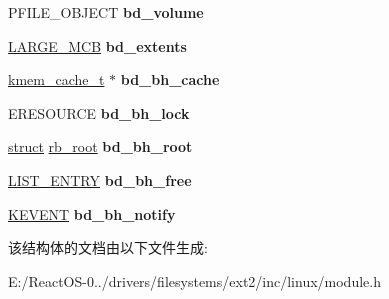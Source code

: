 \begin{DoxyCompactItemize}
P\+F\+I\+L\+E\+\_\+\+O\+B\+J\+E\+CT {\bfseries bd\+\_\+volume}
\item 
\mbox{\label{structblock__device_a7673b57b6cd461d0cfba6c2cd51dd116}} 
\hyperlink{struct___l_a_r_g_e___m_c_b}{L\+A\+R\+G\+E\+\_\+\+M\+CB} {\bfseries bd\+\_\+extents}
\item 
\mbox{\label{structblock__device_ac7dde9db5e5fcf0615cdc7e70f45cdc6}} 
\hyperlink{structkmem__cache}{kmem\+\_\+cache\+\_\+t} $\ast$ {\bfseries bd\+\_\+bh\+\_\+cache}
\item 
\mbox{\label{structblock__device_a8aee0e0e1d7c8af1df9c8705b6e5b6cb}} 
E\+R\+E\+S\+O\+U\+R\+CE {\bfseries bd\+\_\+bh\+\_\+lock}
\item 
\mbox{\label{structblock__device_a98aaff3165bf1f4567a75437240e4d81}} 
\hyperlink{interfacestruct}{struct} \hyperlink{structrb__root}{rb\+\_\+root} {\bfseries bd\+\_\+bh\+\_\+root}
\item 
\mbox{\label{structblock__device_aec6bbd972d12bbf7c0e91bedc76d1737}} 
\hyperlink{struct___l_i_s_t___e_n_t_r_y}{L\+I\+S\+T\+\_\+\+E\+N\+T\+RY} {\bfseries bd\+\_\+bh\+\_\+free}
\item 
\mbox{\label{structblock__device_a9f62eca87f8fca496930b0c9d82a36af}} 
\hyperlink{struct___k_e_v_e_n_t}{K\+E\+V\+E\+NT} {\bfseries bd\+\_\+bh\+\_\+notify}
\end{DoxyCompactItemize}


该结构体的文档由以下文件生成\+:\begin{DoxyCompactItemize}
\item 
E\+:/\+React\+O\+S-\/0../drivers/filesystems/ext2/inc/linux/module.\+h\end{DoxyCompactItemize}
